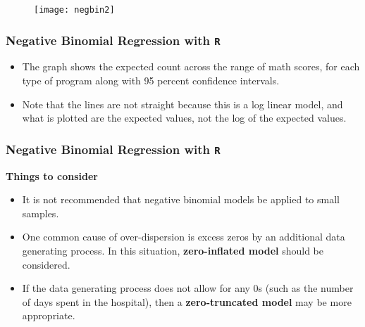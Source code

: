 \documentclass[MASTER.tex]{subfiles}
\begin{document}
\begin{frame}
\begin{figure}
\centering
\texttt{[image: negbin2]}
\caption{}
\label{fig:negbin2}
\end{figure}
	
\end{frame}
%		
%			
%			
%		
\begin{frame}[fragile]
	\frametitle{Negative Binomial Regression with \texttt{R} }
	\Large
	\begin{itemize}
\item The graph shows the expected count across the range of math scores, for each type of program along with 95 percent confidence intervals. 
\item Note that the lines are not straight because this is a log linear model, and what is plotted are the expected values, not the log of the expected values.
\end{itemize}
\end{frame}



\begin{frame}[fragile]
	\frametitle{Negative Binomial Regression with \texttt{R} }
	\Large
	
	\textbf{Things to consider}
	\begin{itemize}
	\item It is not recommended that negative binomial models be applied to small samples.
	\item One common cause of over-dispersion is excess zeros by an additional data generating process. 
	In this situation, \textbf{zero-inflated model} should be considered.
	\item	
	If the data generating process does not allow for any 0s (such as the number of days spent in the hospital), then a \textbf{zero-truncated model} may be more appropriate.
	\end{itemize}
\end{frame}
\end{document}
